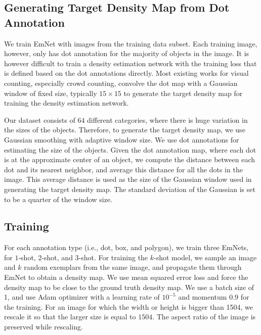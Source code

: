 \subsection{Generating Target Density Map from Dot Annotation}

We train EmNet with images from the training data subset. Each training image, however, only has dot annotation for the majority of objects in the image. It is however difficult to train a density estimation network with the training loss that is defined based on the dot annotations directly. Most existing works for visual counting, especially crowd counting, convolve the dot map with a Gaussian window of fixed size, typically $15{\times}15$ to generate the target density map for training the density estimation network. 

Our dataset consists of $64$ different categories, where there is huge variation in the sizes of the objects. Therefore, to generate the target density map, we use Gaussian smoothing with adaptive window size. We use dot annotations for estimating the size of the objects. Given the dot annotation map, where each dot is at the approximate center of an object, we compute the distance between each dot and its nearest neighbor, and average this distance for all the dots in the image. This average distance is used as the size of the Gaussian window used in generating the target density map. The standard deviation of the Gaussian is set to be a quarter of the window size. 

\subsection{Training}
For each annotation type (i.e., dot, box, and polygon), we train three EmNets, for $1$-shot, 2-shot, and 3-shot. For training the $k$-shot model, we sample an image and $k$ random exemplars from the same image, and propagate them through EmNet to obtain a density map. We use mean squared error loss and force the density map to be close to the ground truth density map. We use a batch size of 1, and use Adam optimizer with a learning rate of $10^{-5}$ and momentum $0.9$ for the training. For an image for which the width or height is bigger than 1504, we rescale it so that the larger size is equal to $1504$. The aspect ratio of the image is preserved while rescaling.
\fi
